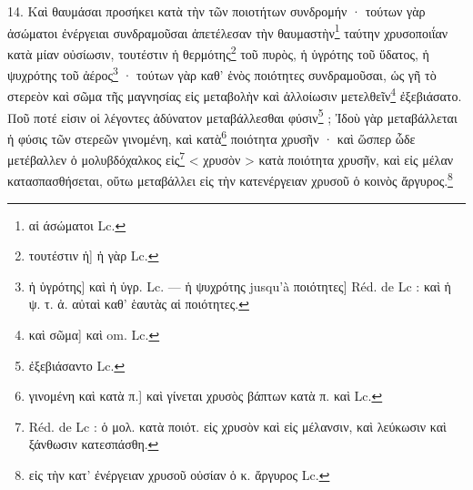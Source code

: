 \documentclass[landscape, a4paper, 11pt, oneside, polutonikogreek, french]{article}
\begin{document}
14. Καὶ θαυμάσαι προσήκει κατὰ τὴν τῶν ποιοτήτων συνδρομήν · τούτων γὰρ ἀσώματοι ἐνέργειαι συνδραμοῦσαι ἀπετέλεσαν τὴν θαυμαστὴν\footnote{αἱ άσώματοι Lc.} ταύτην χρυσοποιΐαν κατὰ μίαν οὐσίωσιν, τουτέστιν ἡ θερμότης\footnote{τουτέστιν ἡ] ἡ γὰρ Lc.} τοῦ πυρὸς, ἡ ὑγρότης τοῦ ὕδατος, ἡ ψυχρότης τοῦ ἀέρος\footnote{ἡ ὑγρότης] καὶ ἡ ὑγρ. Lc. --- ἡ ψυχρότης jusqu'à ποιότητες] Réd. de Lc : καὶ ἡ ψ. τ. ἀ. αὐταὶ καθ' ἑαυτὰς αἱ ποιότητες.} · τούτων γὰρ καθ' ἑνὸς ποιότητες συνδραμοῦσαι, ὡς γῆ τὸ στερεὸν καὶ σῶμα τῆς μαγνησίας εἰς μεταβολὴν καὶ ἀλλοίωσιν μετελθεῖν\footnote{καὶ σῶμα] καὶ om. Lc.} ἐξεβιάσατο. Ποῦ ποτέ εἰσιν οἱ λέγοντες ἀδύνατον μεταβάλλεσθαι φύσιν\footnote{ἐξεβιάσαντο Lc.} ; Ἰδοὺ γὰρ μεταβάλλεται ἡ φύσις τῶν στερεῶν γινομένη, καὶ κατὰ\footnote{γινομένη καὶ κατὰ π.] καὶ γίνεται χρυσὸς βάπτων κατὰ π. καὶ Lc.} ποιότητα χρυσῆν · καὶ ὥσπερ ὧδε μετέβαλλεν ὁ μολυβδόχαλκος εἰς\footnote{Réd. de Lc : ὁ μολ. κατὰ ποιότ. εἰς χρυσὸν καὶ εἰς μέλανσιν, καὶ λεύκωσιν καὶ ξάνθωσιν κατεσπάσθη.} < χρυσὸν > κατὰ ποιότητα χρυσῆν, καὶ εἰς μέλαν κατασπασθήσεται, οὕτω μεταβάλλει εἰς τὴν κατενέργειαν χρυσοῦ ὁ κοινὸς ἄργυρος.\footnote{εἰς τὴν κατ' ἐνέργειαν χρυσοῦ οὐσίαν ὁ κ. ἄργυρος Lc.}
\end{document}
